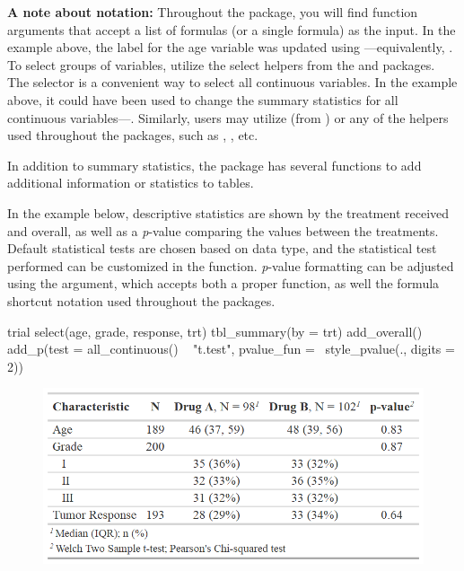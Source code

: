 \textbf{A note about notation:}
Throughout the  package, you will find function arguments that accept a list of formulas (or a single formula) as the input.
In the example above, the label for the age variable was updated using ---equivalently, .
To select groups of variables, utilize the select helpers from the  and  packages.
The  selector is a convenient way to select all continuous variables.
In the example above, it could have been used to change the summary statistics for all continuous variables---.
Similarly, users may utilize  (from ) or any of the  helpers used throughout the  packages, such as , , etc.

In addition to summary statistics, the  package has several functions to add additional information or statistics to  tables.



In the example below, descriptive statistics are shown by the treatment received and overall, as well as a \emph{p}-value comparing the values between the treatments.
Default statistical tests are chosen based on data type, and the statistical test performed can be customized in the  function.
\emph{p}-value formatting can be adjusted using the  argument, which accepts both a proper function, as well the formula shortcut notation used throughout the  packages.

\newpage
\begin{example}
trial %
  select(age, grade, response, trt) %
  tbl_summary(by = trt) %
  add_overall() %
  add_p(test = all_continuous() ~ "t.test",
        pvalue_fun = ~style_pvalue(., digits = 2))

\end{example}
\begin{figure}[h!]
  \includegraphics[scale=0.73]{summary_plus_plus.png}
  \centering
\end{figure}

